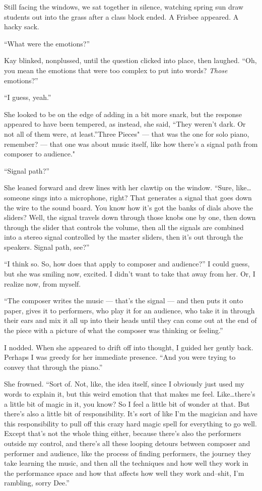 Still facing the windows, we sat together in silence, watching spring sun draw students out into the grass after a class block ended. A Frisbee appeared. A hacky sack.

``What were the emotions?''

Kay blinked, nonplussed, until the question clicked into place, then laughed. ``Oh, you mean the emotions that were too complex to put into words? \emph{Those} emotions?''

``I guess, yeah.''

She looked to be on the edge of adding in a bit more snark, but the response appeared to have been tempered, as instead, she said, ``They weren't dark. Or not all of them were, at least.''Three Pieces" --- that was the one for solo piano, remember? --- that one was about music itself, like how there's a signal path from composer to audience."

``Signal path?''

She leaned forward and drew lines with her clawtip on the window. ``Sure, like\ldots someone sings into a microphone, right? That generates a signal that goes down the wire to the sound board. You know how it's got the banks of dials above the sliders? Well, the signal travels down through those knobs one by one, then down through the slider that controls the volume, then all the signals are combined into a stereo signal controlled by the master sliders, then it's out through the speakers. Signal path, see?''

``I think so. So, how does that apply to composer and audience?'' I could guess, but she was smiling now, excited. I didn't want to take that away from her. Or, I realize now, from myself.

``The composer writes the music --- that's the signal --- and then puts it onto paper, gives it to performers, who play it for an audience, who take it in through their ears and mix it all up into their heads until they can come out at the end of the piece with a picture of what the composer was thinking or feeling.''

I nodded. When she appeared to drift off into thought, I guided her gently back. Perhaps I was greedy for her immediate presence. ``And you were trying to convey that through the piano.''

She frowned. ``Sort of. Not, like, the idea itself, since I obviously just used my words to explain it, but this weird emotion that that makes me feel. Like\ldots there's a little bit of magic in it, you know? So I feel a little bit of wonder at that. But there's also a little bit of responsibility. It's sort of like I'm the magician and have this responsibility to pull off this crazy hard magic spell for everything to go well. Except that's not the whole thing either, because there's also the performers outside my control, and there's all these looping detours between composer and performer and audience, like the process of finding performers, the journey they take learning the music, and then all the techniques and how well they work in the performance space and how that affects how well they work and--shit, I'm rambling, sorry Dee.''

